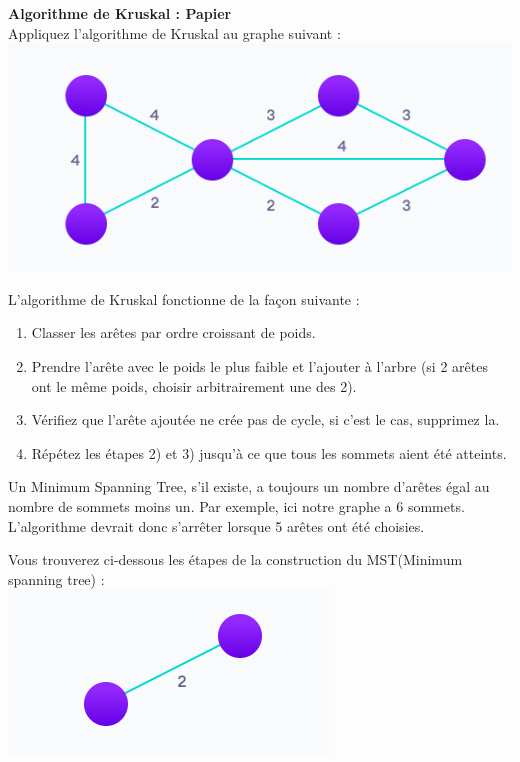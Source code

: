 \begin{Exercice}[5 minutes] \textbf{Algorithme de Kruskal : Papier}\\
    Appliquez l'algorithme de Kruskal au graphe suivant :\\
    \includegraphics[]{Kruskal.PNG}
    \begin{conseil}
        L'algorithme de Kruskal fonctionne de la façon suivante :
        \begin{enumerate}
            \item Classer les arêtes par ordre croissant de poids.
            \item Prendre l'arête avec le poids le plus faible et l'ajouter à l'arbre (si 2 arêtes ont le même poids, choisir arbitrairement une des 2).
            \item Vérifiez que l'arête ajoutée ne crée pas de cycle, si c'est le cas, supprimez la.
            \item Répétez les étapes 2) et 3) jusqu'à ce que tous les sommets aient été atteints.
        \end{enumerate}
        Un Minimum Spanning Tree, s'il existe, a toujours un nombre d'arêtes égal au nombre de sommets moins un. Par exemple, ici notre graphe a 6 sommets. L'algorithme devrait donc s'arrêter lorsque 5 arêtes ont été choisies.
    \end{conseil}
    \begin{solution}
        Vous trouverez ci-dessous les étapes de la construction du MST(Minimum spanning tree) :\\
        \includegraphics[]{K1.PNG}\\

\end{solution}
\end{Exercice}
